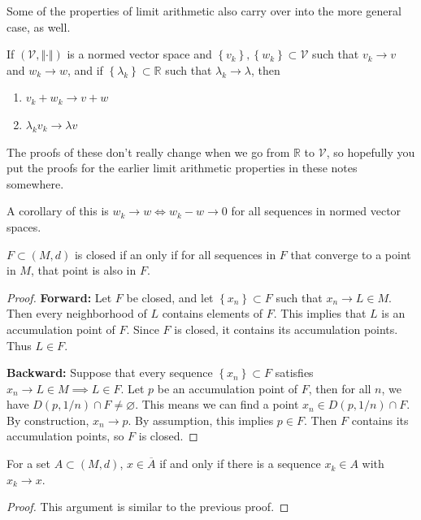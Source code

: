 \documentclass[10pt]{report}
\begin{document}
Some of the properties of limit arithmetic also carry over into the more general case, as well.
\begin{prop}
	If $(\mathcal{V},\Vert{\cdot}\Vert)$ is a normed vector space and $\left\{ v_k \right\}, \left\{ w_k \right\} \subset \mathcal{V}$ such that $v_k \to v$ and $w_k \to w$, and if $\left\{ \lambda_k \right\} \subset \mathbb{R}$ such that $\lambda_k \to \lambda$, then
	\begin{enumerate}
		\item $v_k + w_k \to v+w$
		\item $\lambda_k v_k \to \lambda v$
	\end{enumerate}
\end{prop}
The proofs of these don't really change when we go from $\mathbb{R}$ to $\mathcal{V}$, so hopefully you put the proofs for the earlier limit arithmetic properties in these notes somewhere.

A corollary of this is $w_k \to w \iff w_k - w \to 0$ for all sequences in normed vector spaces.

\begin{prop}
	$F\subset (M,d)$ is closed if an only if for all sequences in $F$ that converge to a point in $M$, that point is also in $F$.
\end{prop}
\begin{proof}
	\textbf{Forward:} Let $F$ be closed, and let $\left\{ x_n \right\}\subset F$ such that $x_n \to L \in M$. Then every neighborhood of $L$ contains elements of $F$. This implies that $L$ is an accumulation point of $F$. Since $F$ is closed, it contains its accumulation points. Thus $L \in F$.

	\textbf{Backward:} Suppose that every sequence $\left\{ x_n \right\}\subset F$ satisfies  $x_n \to L \in M \implies L \in F$. Let $p$ be an accumulation point of $F$, then for all $n$, we have $D(p,1/n) \cap F \neq \varnothing$. This means we can find a point $x_n \in D(p,1/n) \cap F$. By construction, $x_n \to p$. By assumption, this implies $p \in F$. Then $F$ contains its accumulation points, so $F$ is closed.
\end{proof}

\begin{prop}
	For a set $A \subset (M,d)$, $x \in \overline{A}$ if and only if there is a sequence $x_k \in A$ with $x_k \to x$.
\end{prop}
\begin{proof}
	This argument is similar to the previous proof.
\end{proof}
\end{document}
